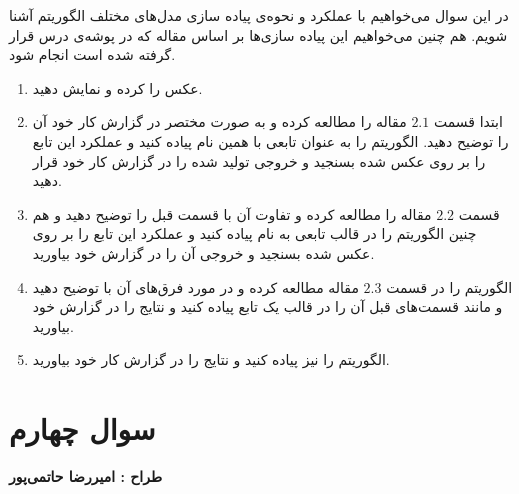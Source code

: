 \documentclass[a4paper]{article}
\begin{document}
در این سوال می‌خواهیم با  عملکرد و نحوه‌ی پیاده سازی مدل‌های مختلف الگوریتم
 آشنا شویم. هم چنین می‌خواهیم این پیاده سازی‌ها بر اساس مقاله 
\href{https://www.ipol.im/pub/art/2014/107/article.pdf}{} 
که در پوشه‌ی درس قرار گرفته شده است انجام شود.
\begin{enumerate}
\item 
عکس  را  کرده و نمایش دهید.
\item 
ابتدا قسمت
$  2.1  $
مقاله 
را مطالعه کرده و به صورت مختصر در گزارش کار خود آن را توضیح دهید. الگوریتم
 را به عنوان تابعی با همین نام پیاده کنید  و عملکرد این تابع را بر روی عکس
 شده بسنجید و خروجی تولید شده را در گزارش کار خود قرار دهید.
\item 
قسمت
$ 2.2  $
مقاله
را مطالعه کرده و تفاوت آن با قسمت قبل را توضیح دهید و هم چنین الگوریتم را در قالب تابعی به نام
 پیاده کنید و عملکرد این تابع را بر روی عکس
شده بسنجید و خروجی آن را در گزارش خود بیاورید. 
\item 
الگوریتم
  را در قسمت
$  2.3 $
 مقاله مطالعه کرده و در مورد فرق‌های آن با
 توضیح دهید و مانند قسمت‌های قبل آن را در قالب یک تابع پیاده کنید و نتایج را در گزارش خود بیاورید.
\item 
الگوریتم
را نیز پیاده کنید و نتایج را در گزارش کار خود بیاورید.
\end{enumerate}

\section*{سوال چهارم}
\textbf{طراح :‌ امیررضا حاتمی‌پور}
\vspace{0.3cm}
\end{document}
